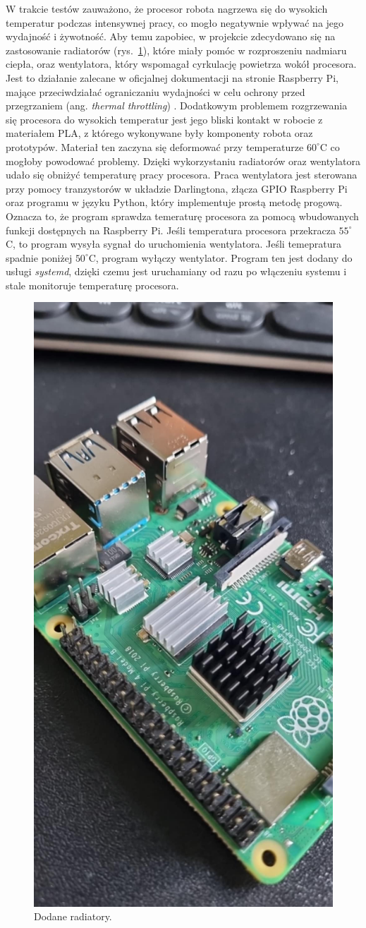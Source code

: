 W trakcie testów zauważono, że procesor robota nagrzewa się do wysokich temperatur podczas intensywnej pracy, 
co mogło negatywnie wpływać na jego wydajność i żywotność. Aby temu zapobiec, w projekcie zdecydowano się na 
zastosowanie radiatorów (rys.~\ref{fig:zimno}), które miały pomóc w rozproszeniu nadmiaru ciepła, oraz wentylatora, który 
wspomagał cyrkulację powietrza wokół procesora. Jest to działanie zalecane w oficjalnej dokumentacji na stronie Raspberry Pi, mające przeciwdziałać 
ograniczaniu wydajności w celu ochrony przed przegrzaniem (ang. \textit{thermal throttling}) \cite{cooling}. 
Dodatkowym problemem rozgrzewania się procesora do wysokich temperatur jest jego bliski kontakt w robocie z materiałem PLA, z którego wykonywane były komponenty robota
oraz prototypów. Materiał ten zaczyna się deformować przy temperaturze $60^{\circ}$C \cite{plaprusa} co mogłoby powodować problemy. Dzięki wykorzystaniu radiatorów oraz 
wentylatora udało się obniżyć temperaturę pracy procesora. Praca wentylatora jest sterowana przy pomocy tranzystorów w układzie Darlingtona, złącza GPIO Raspberry Pi oraz programu 
w języku Python, który implementuje prostą metodę progową. Oznacza
to, że program sprawdza temeraturę procesora za pomocą wbudowanych funkcji dostępnych na Raspberry Pi. Jeśli temperatura procesora przekracza $55^{\circ}$C, to program wysyła sygnał 
do uruchomienia wentylatora. Jeśli temepratura spadnie poniżej $50^{\circ}$C, program wyłączy wentylator. Program ten jest dodany do usługi \textit{systemd}, dzięki czemu jest uruchamiany
od razu po włączeniu systemu i stale monitoruje temperaturę procesora.

\begin{figure}[H]
    \centering
    \includegraphics[width=0.25\linewidth, trim={0mm 50mm 0mm 120mm}, clip]{chapters/03-praca-wlasna/figures/now_we_are_cool}
    \caption{\label{fig:zimno}Dodane radiatory.}
\end{figure}


